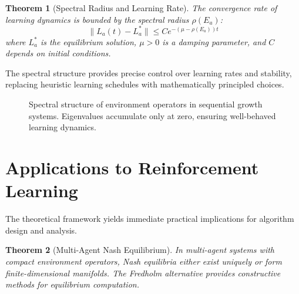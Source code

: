 \documentclass[11pt]{article}
\newtheorem{theorem}{Theorem}
\begin{document}
\begin{theorem}[Spectral Radius and Learning Rate]
The convergence rate of learning dynamics is bounded by the spectral radius $\rho(E_a)$:
\begin{equation}
\|L_a(t) - L_a^*\| \leq C e^{-(\mu - \rho(E_a))t}
\end{equation}
where $L_a^*$ is the equilibrium solution, $\mu > 0$ is a damping parameter, and $C$ depends on initial conditions.
\end{theorem}

The spectral structure provides precise control over learning rates and stability, replacing heuristic learning schedules with mathematically principled choices.

\begin{figure}[htbp]
\centering
{}
\caption{Spectral structure of environment operators in sequential growth systems. Eigenvalues accumulate only at zero, ensuring well-behaved learning dynamics.}
\end{figure}

\section{Applications to Reinforcement Learning}

The theoretical framework yields immediate practical implications for algorithm design and analysis.

\begin{theorem}[Multi-Agent Nash Equilibrium]
In multi-agent systems with compact environment operators, Nash equilibria either exist uniquely or form finite-dimensional manifolds. The Fredholm alternative provides constructive methods for equilibrium computation.
\end{theorem}
\end{document}
